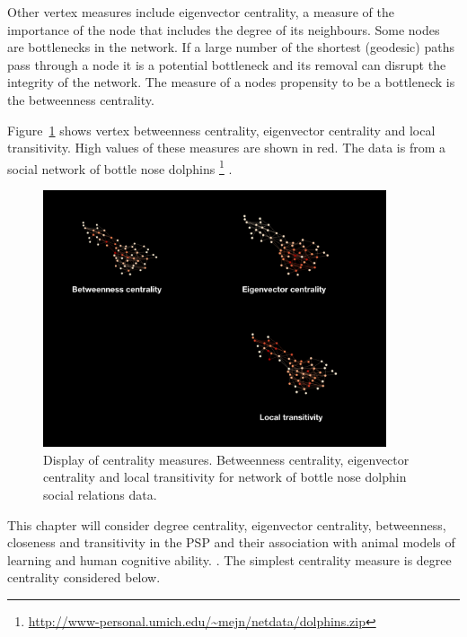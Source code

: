 Other vertex measures include eigenvector centrality, a measure of the importance of the node that includes the degree of its neighbours. \cite{bonacich1987power}  Some nodes are bottlenecks in the network. If a large number of the shortest (geodesic) paths pass through a node it is a potential bottleneck and its removal can disrupt the integrity of the network. The measure of a nodes propensity to be a bottleneck is the betweenness centrality. \cite{freeman1977set} 

Figure~\ref{fig:dolphin} shows vertex betweenness centrality, eigenvector centrality and local transitivity. High values of these measures are shown in red. The data is from a social network of bottle nose dolphins \footnote{\url{http://www-personal.umich.edu/~mejn/netdata/dolphins.zip}} \cite{lusseau2003bottlenose} .

\begin{figure}
    \centering
    \includegraphics[width=0.9\textwidth]{images/centrality2.002.png}
    \caption{Display of centrality measures. Betweenness centrality, eigenvector centrality and local transitivity for network of bottle nose dolphin social relations data. \cite{lusseau2003bottlenose}}
    \label{fig:dolphin}
\end{figure}

This chapter will consider degree centrality, eigenvector centrality, betweenness, closeness and transitivity in the PSP and their association with animal models of learning and human cognitive ability. . The simplest centrality measure is degree centrality \cite{newman2018networks} considered below. 

